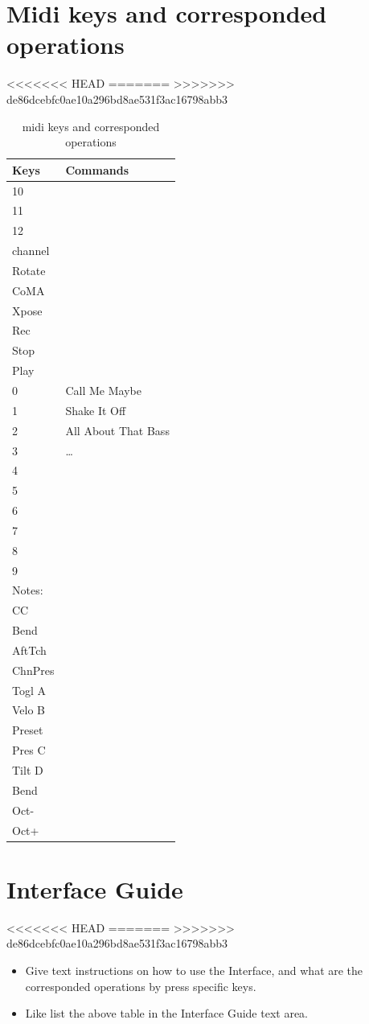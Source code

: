 \documentclass[9pt,b5paper]{article}
\begin{document}
\section{Midi keys and corresponded operations}
<<<<<<< HEAD
\label{sec-16}
=======
\label{sec-15}
>>>>>>> de86dcebfc0ae10a296bd8ae531f3ac16798abb3
\begin{table}[htb]
\caption{midi keys and corresponded operations}
\centering
\begin{tabular}{ll}
\hline
Keys & Commands\\
\hline
10 & \\
11 & \\
12 & \\
channel & \\
Rotate & \\
CoMA & \\
Xpose & \\
Rec & \\
Stop & \\
Play & \\
\hline
0 & Call Me Maybe\\
1 & Shake It Off\\
2 & All About That Bass\\
3 & \ldots{}\\
4 & \\
5 & \\
6 & \\
7 & \\
8 & \\
9 & \\
\hline
Notes: & \\
CC & \\
Bend & \\
AftTch & \\
ChnPres & \\
\hline
Togl A & \\
Velo B & \\
Preset & \\
Pres C & \\
Tilt D & \\
Bend & \\
Oct- & \\
Oct+ & \\
\hline
\end{tabular}
\end{table}
\section{Interface Guide}
<<<<<<< HEAD
\label{sec-17}
=======
\label{sec-16}
>>>>>>> de86dcebfc0ae10a296bd8ae531f3ac16798abb3
\begin{itemize}
\item Give text instructions on how to use the Interface, and what are the corresponded operations by press specific keys.
\item Like list the above table in the Interface Guide text area.
\end{itemize}
\end{document}
